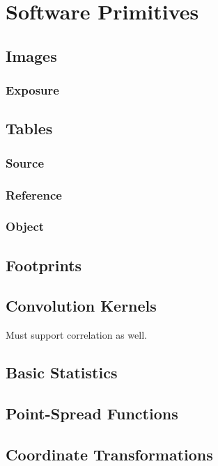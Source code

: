 \section{Software Primitives}
\label{sec:software-primitives}

\subsection{Images}
\label{sec:spImages}

\subsubsection{Exposure}
\label{sec:spImagesExposure}

\subsection{Tables}
\label{sec:spTables}

\subsubsection{Source}
\label{sec:spTablesSource}

\subsubsection{Reference}
\label{sec:spTablesReference}

\subsubsection{Object}
\label{sec:spTablesObject}

\subsection{Footprints}
\label{sec:spFootprints}

\subsection{Convolution Kernels}
\label{sec:spKernels}
Must support correlation as well.

\subsection{Basic Statistics}
\label{sec:spStatistics}

\subsection{Point-Spread Functions}
\label{sec:spPSF}

\subsection{Coordinate Transformations}
\label{sec:spWCS}

